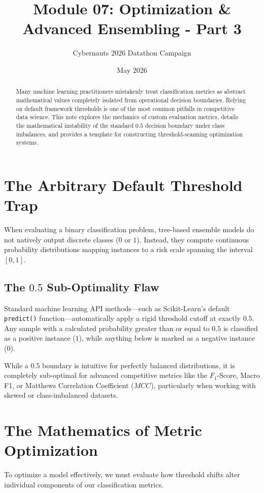 \documentclass{article}
\title{Module 07: Optimization \& Advanced Ensembling - Part 3}
\author{Cybernauts 2026 Datathon Campaign}
\date{May 2026}
\begin{document}
\maketitle

\begin{abstract}
Many machine learning practitioners mistakenly treat classification metrics as abstract mathematical values completely isolated from operational decision boundaries. Relying on default framework thresholds is one of the most common pitfalls in competitive data science. This note explores the mechanics of custom evaluation metrics, details the mathematical instability of the standard $0.5$ decision boundary under class imbalances, and provides a template for constructing threshold-scanning optimization systems.
\end{abstract}

\tableofcontents
\newpage

\section{The Arbitrary Default Threshold Trap}
When evaluating a binary classification problem, tree-based ensemble models do not natively output discrete classes ($0$ or $1$). Instead, they compute continuous probability distributions mapping instances to a risk scale spanning the interval $[0, 1]$.

\subsection{The $0.5$ Sub-Optimality Flaw}
Standard machine learning API methods—such as Scikit-Learn's default \texttt{predict()} function—automatically apply a rigid threshold cutoff at exactly $0.5$. Any sample with a calculated probability greater than or equal to $0.5$ is classified as a positive instance ($1$), while anything below is marked as a negative instance ($0$).

While a $0.5$ boundary is intuitive for perfectly balanced distributions, it is completely sub-optimal for advanced competitive metrics like the $F_1$-Score, Macro F1, or Matthews Correlation Coefficient ($MCC$), particularly when working with skewed or class-imbalanced datasets.

\section{The Mathematics of Metric Optimization}
To optimize a model effectively, we must evaluate how threshold shifts alter individual components of our classification metrics.
\end{document}
